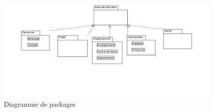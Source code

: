 \begin{figure}[H]
	\centering
	\includegraphics[scale=0.3]{diagrammePackage/images/diagrammePackage}
	\caption{Diagramme de packages}
	\label{diagramme_package}	
\end{figure}	